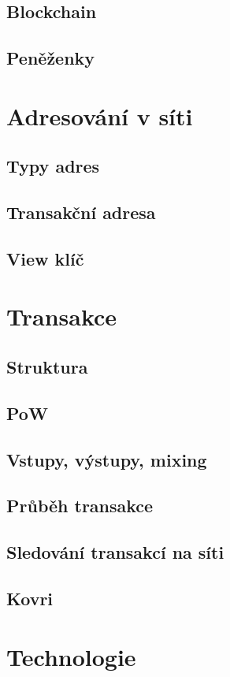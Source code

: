 \documentclass[
  printed, %
  table,   %
  nolof,     %
  nolot,     %
           oneside, color
]{fithesis3}
\begin{document}
\subsection{Blockchain}
\label{sec:blockchain}
\subsection{Peněženky}

\section{Adresování v síti}
\subsection{Typy adres}
\subsection{Transakční adresa}
\subsection{View klíč}
\section{Transakce}
\subsection{Struktura}
\subsection{PoW}
\subsection{Vstupy, výstupy, mixing}
\subsection{Průběh transakce}
\subsection{Sledování transakcí na síti}
\subsection{Kovri}
\section{Technologie}
\end{document}
